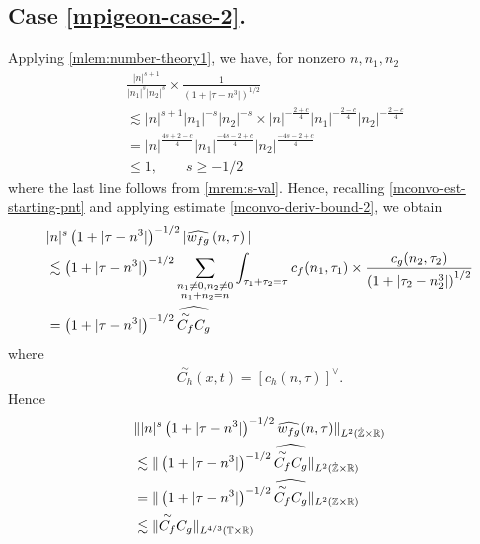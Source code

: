 \subsection{Case \texorpdfstring{\eqref{mpigeon-case-2}}{2}.}
Applying \cref{mlem:number-theory1}, we have, for nonzero $ n, n_1, n_2 $
\begin{equation}
	\label{mconvo-deriv-bound-2}
	\begin{split}
		& \frac{|n|^{s+1}}{|n_1|^s 
		| n_2|^s}
		\times
		\frac{1}{(1 + | \tau -n^3 |)^{1/2}}
		\\
		& \lesssim | n |^{s+1}| n_1 |^{-s}| n_2 |^{-s} \times | n
		|^{-\frac{2+c}{4}}| n_1 |^{-\frac{2-c}{4}}| n_2 |^{-\frac{2-c}{4}} 
		\\
		& = | n |^{\frac{4s +2 -c}{4}} | n_1 |^{\frac{-4s -2 +c}{4}} | n_2
		|^{\frac{-4s -2 +c}{4}}
		\\
		& \le 1, \qquad s \ge -1/2
	\end{split}  
\end{equation}
%
%
where the last line follows from \cref{mrem:s-val}.
%
%
Hence, recalling \eqref{mconvo-est-starting-pnt} and applying estimate 
\eqref{mconvo-deriv-bound-2}, we obtain
%
%
\begin{equation}
	\label{m1f}
	\begin{split}
		& |n|^s  \left( 1 + | \tau - n^3 | \right)^{-1/2}| \widehat{w_{fg}}\left( 
		n, \tau \right) |
		\\
		& \lesssim 
		\left( 1 + | \tau - n^3 | \right)^{-1/2}\sum_{\substack{n_1 \neq0, n_2 \neq 0 \\n_1 + n_2 =n}} \int_{\tau_1 + \tau_2 = \tau}		c_f(n_1, \tau_1)
		\times
		\frac{c_g(n_2, \tau_2)}{\left( 1 + | \tau_2 - n_2^3 | 
		\right)^{1/2}} 
		\\
		& = \left( 1 + | \tau - n^3 | \right)^{-1/2} \widehat{\overset{\sim}{C_f} C_g}
	\end{split}
\end{equation}
%
where
%
%
\begin{equation*}
	\begin{split}
		\overset{\sim}{C_h}(x,t) = \left[ c_h(n, \tau) \right]^\vee.
	\end{split}
\end{equation*}
%
%
Hence
%
\begin{equation}
	\label{m3f}
	\begin{split}
		& \| |n|^s \left( 1 + | \tau - n^3 | \right)^{-1/2} \widehat{w_{fg}}(n, \tau) 
		\|_{L^2(\dot{\mathbb{Z}} \times \mathbb{R})}
		\\
		& \lesssim \|\left( 1 + | \tau - n^3 | \right)^{-1/2} 
		\widehat{\overset{\sim}{C_f} C_g } \|_{L^2(\dot{\mathbb{Z}} \times \mathbb{R})}
		\\
		& =  \|\left( 1 + | \tau - n^3 | \right)^{-1/2} 
		\widehat{\overset{\sim}{C_f} C_g } \|_{L^2(\mathbb{Z} \times \mathbb{R})}
		\\
		& \lesssim  \|\overset{\sim}{C_f} C_g  \|_{L^{4/3}(\mathbb{T} \times \mathbb{R})}
	\end{split}
\end{equation}
